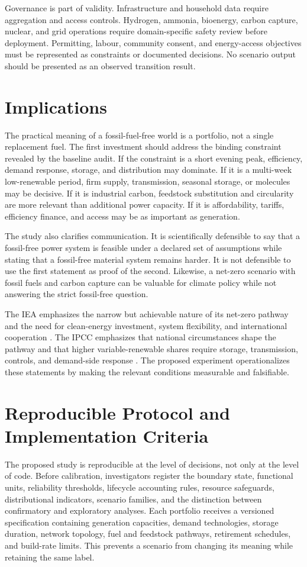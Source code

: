\documentclass[conference]{IEEEtran}
\begin{document}
Governance is part of validity. Infrastructure and household data require aggregation and access controls. Hydrogen, ammonia, bioenergy, carbon capture, nuclear, and grid operations require domain-specific safety review before deployment. Permitting, labour, community consent, and energy-access objectives must be represented as constraints or documented decisions. No scenario output should be presented as an observed transition result.

\section{Implications}
\label{sec:implications}
The practical meaning of a fossil-fuel-free world is a portfolio, not a single replacement fuel. The first investment should address the binding constraint revealed by the baseline audit. If the constraint is a short evening peak, efficiency, demand response, storage, and distribution may dominate. If it is a multi-week low-renewable period, firm supply, transmission, seasonal storage, or molecules may be decisive. If it is industrial carbon, feedstock substitution and circularity are more relevant than additional power capacity. If it is affordability, tariffs, efficiency finance, and access may be as important as generation.

The study also clarifies communication. It is scientifically defensible to say that a fossil-free power system is feasible under a declared set of assumptions while stating that a fossil-free material system remains harder. It is not defensible to use the first statement as proof of the second. Likewise, a net-zero scenario with fossil fuels and carbon capture can be valuable for climate policy while not answering the strict fossil-free question.

The IEA emphasizes the narrow but achievable nature of its net-zero pathway and the need for clean-energy investment, system flexibility, and international cooperation \cite{iea_nz}. The IPCC emphasizes that national circumstances shape the pathway and that higher variable-renewable shares require storage, transmission, controls, and demand-side response \cite{ipcc_wg3}. The proposed experiment operationalizes these statements by making the relevant conditions measurable and falsifiable.

\section{Reproducible Protocol and Implementation Criteria}
\label{sec:repro}
The proposed study is reproducible at the level of decisions, not only at the level of code. Before calibration, investigators register the boundary state, functional units, reliability thresholds, lifecycle accounting rules, resource safeguards, distributional indicators, scenario families, and the distinction between confirmatory and exploratory analyses. Each portfolio receives a versioned specification containing generation capacities, demand technologies, storage duration, network topology, fuel and feedstock pathways, retirement schedules, and build-rate limits. This prevents a scenario from changing its meaning while retaining the same label.
\end{document}
